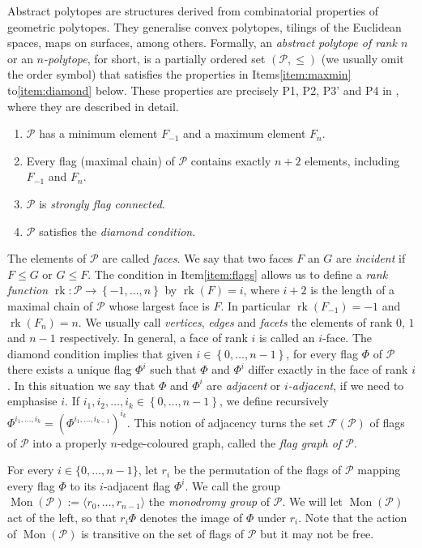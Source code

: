 \documentclass[final]{amsart}
\theoremstyle{plain}
\theoremstyle{definition}
\theoremstyle{remark}
\numberwithin{equation}{section}
\renewcommand{\leq}{\leqslant} \renewcommand{\geq}{\geqslant}
\renewcommand{\{}{\lbrace}
\renewcommand{\}}{\rbrace}
\newcommand{\cF}{\mathcal{F}}
\newcommand{\cP}{\mathcal{P}}
\DeclareMathOperator{\rk}{rk}
\DeclareMathOperator{\mon}{Mon}
\begin{document}
Abstract polytopes are structures derived from combinatorial properties of geometric polytopes. 
They generalise convex polytopes, tilings of the Euclidean spaces, maps on surfaces, among others.
Formally, an \emph{abstract polytope of rank $n$} or an \emph{$n$-polytope}, for short, is a partially ordered set $(\cP, \leq)$ (we usually omit the order symbol) that satisfies the properties in Items\nobreakspace  \ref {item:maxmin} to\nobreakspace  \ref {item:diamond}  below. 
 These properties are precisely P1, P2, P3' and P4 in \cite[Section 2A]{McMullenSchulte_2002_AbstractRegularPolytopes}, where they are described in detail.
 \begin{enumerate}
  \item \label{item:maxmin} $\cP$ has a minimum element $F_{-1}$ and a maximum element $F_{n}$.
\item \label{item:flags} Every flag (maximal chain) of $\cP$ contains exactly $n+2$ elements, including $F_{-1}$ and $F_{n}$.
\item \label{item:sfc} $\cP$ is \emph{strongly flag connected}.
 \item \label{item:diamond} $\cP$ satisfies the \emph{diamond condition}.
\end{enumerate}
The elements of $\cP$ are called \emph{faces}. 
We say that two faces $F$ an $G$ are \emph{incident} if $F \leq G$ or $G\leq F$.
The condition in Item\nobreakspace \ref {item:flags} allows us to define a \emph{rank function} $\rk: \cP \to \left\{ -1, \dots, n \right\} $ by $\rk(F)=i$, where $i+2$ is the length of a maximal chain of $\cP$ whose largest face is $F$. 
In particular $\rk(F_{-1}) = -1$ and $\rk(F_{n})=n$. 
We usually call \emph{vertices}, \emph{edges} and \emph{facets} the elements of rank $0$, $1$ and $n-1$ respectively.
In general, a face of rank $i$ is called an $i$-face.
The diamond condition implies that given $i \in \left\{ 0, \dots, n-1 \right\} $, for every flag $\Phi$ of $\cP$ there exists a unique flag $\Phi^{i}$ such that $\Phi$ and $\Phi^{i}$ differ exactly in the face of rank $i$. 
In this situation we say that $\Phi$ and $\Phi^{i}$ are \emph{adjacent} or \emph{$i$-adjacent}, if we need to emphasise $i$.
If $i_{1}, i_{2}, \dots, i_{k} \in \left\{ 0, \dots, n-1 \right\} $, we define recursively $\Phi^{i_{1}, \dots, i_{k}} = (\Phi^{i_{1}, \dots, i_{k-1}})^{i_{k}}$.
This notion of adjacency turns the set $\cF(\cP)$ of flags of $\cP$ into a properly $n$-edge-coloured graph, called the \emph{flag graph of $\cP$}.

For every $i \in \{0,\ldots,n-1\}$, let $r_i$ be the permutation of the flags of $\cP$ mapping every flag $\Phi$ to its $i$-adjacent flag $\Phi^i$. We call the group $\mon(\cP) := \langle r_0, \ldots, r_{n-1} \rangle$  the \emph{monodromy group} of $\cP$. We will let $\mon(\cP)$ act of the left, so that $r_i\Phi$ denotes the image of $\Phi$ under $r_i$. Note that the action of $\mon(\cP)$ is transitive on the set of flags of $\cP$ but it may not be free.
\end{document}
